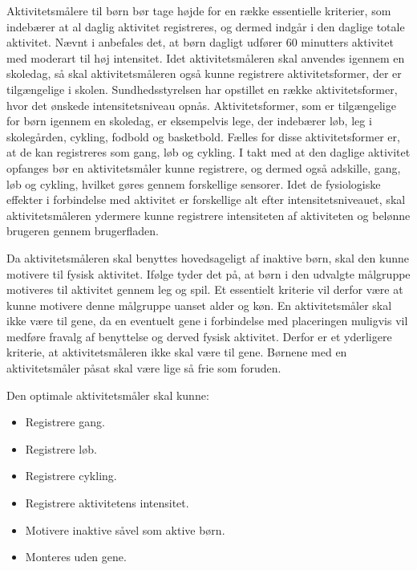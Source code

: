 Aktivitetsmålere til børn bør tage højde for en række essentielle kriterier, som indebærer at al daglig aktivitet registreres, og dermed indgår i den daglige totale aktivitet. Nævnt i  anbefales det, at børn dagligt udfører 60 minutters aktivitet med moderart til høj intensitet. Idet aktivitetsmåleren skal anvendes igennem en skoledag, så skal aktivitetsmåleren også kunne registrere aktivitetsformer, der er tilgængelige i skolen. Sundhedsstyrelsen har opstillet en række aktivitetsformer, hvor det ønskede intensitetsniveau opnås. Aktivitetsformer, som er tilgængelige for børn igennem en skoledag, er eksempelvis lege, der indebærer løb, leg i skolegården, cykling, fodbold og basketbold. Fælles for disse aktivitetsformer er, at de kan registreres som gang, løb og cykling. \citep{Sundhedsstyrelsen2003}
I takt med at den daglige aktivitet opfanges bør en aktivitetsmåler kunne registrere, og dermed også adskille, gang, løb og cykling, hvilket gøres gennem forskellige sensorer. 
Idet de fysiologiske effekter i forbindelse med aktivitet er forskellige alt efter intensitetsniveauet, skal aktivitetsmåleren ydermere kunne registrere intensiteten af aktiviteten og belønne brugeren gennem brugerfladen.  

Da aktivitetsmåleren skal benyttes hovedsageligt af inaktive børn, skal den kunne motivere til fysisk aktivitet. Ifølge  tyder det på, at børn i den udvalgte målgruppe motiveres til aktivitet gennem leg og spil. Et essentielt kriterie vil derfor være at kunne motivere denne målgruppe uanset alder og køn. \newline
En aktivitetsmåler skal ikke være til gene, da en eventuelt gene i forbindelse med placeringen muligvis vil medføre fravalg af benyttelse og derved fysisk aktivitet. Derfor er et yderligere kriterie, at aktivitetsmåleren ikke skal være til gene. Børnene med en aktivitetsmåler påsat skal være lige så frie som foruden.

Den optimale aktivitetsmåler skal kunne: 
\begin{itemize}
\item Registrere gang.
\item Registrere løb.
\item Registrere cykling.
\item Registrere aktivitetens intensitet. %
\item Motivere inaktive såvel som aktive børn. %
\item Monteres uden gene.
\end{itemize}

